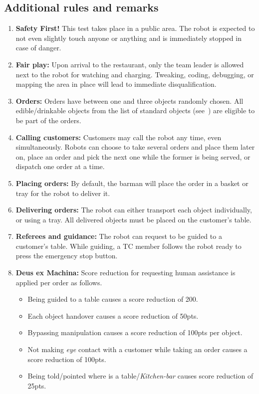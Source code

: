 \subsection*{Additional rules and remarks}
\begin{enumerate}[nosep]
	\item \textbf{Safety First!} This test takes place in a public area. The robot is expected to not even slightly touch anyone or anything and is immediately stopped in case of danger.

	\item \textbf{Fair play:} Upon arrival to the restaurant, only the team leader is allowed next to the robot for watching and charging.
	Tweaking, coding, debugging, or mapping the area in place will lead to immediate disqualification.

	\item \textbf{Orders:} Orders have between one and three objects randomly chosen.
	All edible/drinkable objects from the list of standard objects (see~) are eligible to be part of the orders.

	\item \textbf{Calling customers:} Customers may call the robot any time, even simultaneously.
	Robots can choose to take several orders and place them later on, place an order and pick the next one while the former is being served, or dispatch one order at a time.

	\item \textbf{Placing orders:} By default, the barman will place the order in a basket or tray for the robot to deliver it.

	\item \textbf{Delivering orders:} The robot can either transport each object individually, or using a tray. All delivered objects must be placed on the customer's table.

	\item \textbf{Referees and guidance:} The robot can request to be guided to a customer's table. While guiding, a TC member follows the robot ready to press the emergency stop button.

    \item \textbf{Deus ex Machina:} Score reduction for requesting human assistance is applied per order as follows.
	\begin{itemize}[nosep]
		\item Being guided to a table causes a score reduction of 200.
		\item Each object handover causes a score reduction of 50pts.
		\item Bypassing manipulation causes a score reduction of 100pts per object.
		\item Not making \emph{eye} contact with a customer while taking an order causes a score reduction of 100pts.
		\item Being told/pointed where is a table/\textit{Kitchen-bar} causes score reduction of 25pts.
	\end{itemize}


\end{enumerate}
